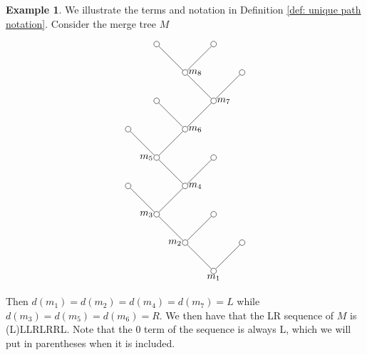 \documentclass{article}
\theoremstyle{definition}
\newtheorem{ex}[thm]    {Example}
\begin{document}
\begin{ex} We illustrate the terms and notation in Definition \ref{def: unique path notation}.  Consider the merge tree $M$

$$
\begin{tikzpicture}

\node[inner sep=2pt, circle] (0) at (1,9) [draw] {};
\node[inner sep=2pt, circle] (1) at (3,9) [draw] {};
\node[inner sep=2pt, circle] (2) at (2,8) [draw] {};
\node[inner sep=2pt, circle] (3) at (4,8) [draw] {};
\node[inner sep=2pt, circle] (4) at (3,7) [draw] {};
\node[inner sep=2pt, circle] (5) at (1,7) [draw] {};
\node[inner sep=2pt, circle] (6) at (2,6) [draw] {};
\node[inner sep=2pt, circle] (7) at (0,6) [draw] {};
\node[inner sep=2pt, circle] (8) at (1,5) [draw] {};
\node[inner sep=2pt, circle] (9) at (3,5) [draw] {};
\node[inner sep=2pt, circle] (10) at (2,4) [draw] {};
\node[inner sep=2pt, circle] (11) at (0,4) [draw] {};
\node[inner sep=2pt, circle] (12) at (1,3) [draw] {};
\node[inner sep=2pt, circle] (13) at (3,3) [draw] {};
\node[inner sep=2pt, circle] (14) at (2,2) [draw] {};
\node[inner sep=2pt, circle] (15) at (4,2) [draw] {};
\node[inner sep=2pt, circle] (16) at (3,1) [draw] {};


\draw[-]  (0)--(2) node[midway, below] {};
\draw[-]  (1)--(2) node[midway, below] {};
\draw[-]  (2)--(4) node[midway, below] {};
\draw[-]  (3)--(4) node[midway, below] {};
\draw[-]  (5)--(6) node[midway, below] {};
\draw[-]  (6)--(4) node[midway, below] {};
\draw[-]  (7)--(8) node[midway, below] {};
\draw[-]  (6)--(8) node[midway, below] {};
\draw[-]  (8)--(10) node[midway, below] {};
\draw[-]  (10)--(9) node[midway, below] {};
\draw[-]  (11)--(12) node[midway, below] {};
\draw[-]  (12)--(10) node[midway, below] {};
\draw[-]  (12)--(14) node[midway, below] {};
\draw[-]  (13)--(14) node[midway, below] {};
\draw[-]  (14)--(16) node[midway, below] {};
\draw[-]  (15)--(16) node[midway, below] {};

\node[anchor = north]  at (16) {{$m_1$}};
\node[anchor = east]  at (14) {{$m_2$}};
\node[anchor = east]  at (12) {{$m_3$}};
\node[anchor = west]  at (10) {{$m_4$}};
\node[anchor = east]  at (8) {{$m_5$}};
\node[anchor = west]  at (6) {{$m_6$}};
\node[anchor = west]  at (4) {{$m_7$}};
\node[anchor = west]  at (2) {{$m_8$}};


\end{tikzpicture}
$$

Then $d(m_1)=d(m_2)=d(m_4)=d(m_7)=L$ while $d(m_3)=d(m_5)=d(m_6)=R$.
We then have that the LR sequence of $M$ is (L)LLRLRRL. Note that the $0$ term of the sequence is always L, which we will put in parentheses when it is included.
\end{ex}
\end{document}
